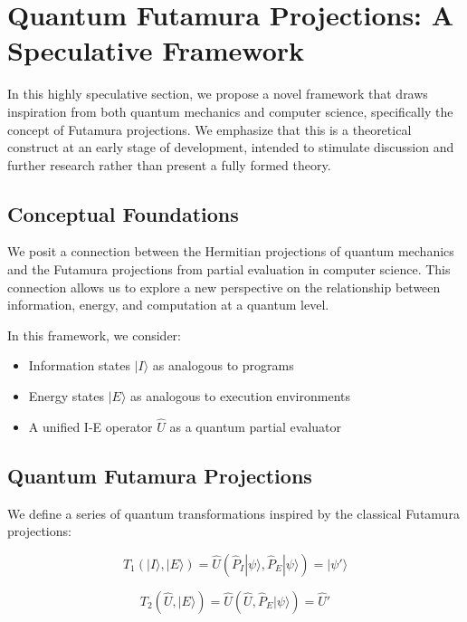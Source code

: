 \section{Quantum Futamura Projections: A Speculative Framework}

In this highly speculative section, we propose a novel framework that draws inspiration from both quantum mechanics and computer science, specifically the concept of Futamura projections. We emphasize that this is a theoretical construct at an early stage of development, intended to stimulate discussion and further research rather than present a fully formed theory.

\subsection{Conceptual Foundations}

We posit a connection between the Hermitian projections of quantum mechanics and the Futamura projections from partial evaluation in computer science. This connection allows us to explore a new perspective on the relationship between information, energy, and computation at a quantum level.

In this framework, we consider:

\begin{itemize}
    \item Information states $|I\rangle$ as analogous to programs
    \item Energy states $|E\rangle$ as analogous to execution environments
    \item A unified I-E operator $\hat{U}$ as a quantum partial evaluator
\end{itemize}

\subsection{Quantum Futamura Projections}

We define a series of quantum transformations inspired by the classical Futamura projections:

\begin{equation}
    T_1(|I\rangle, |E\rangle) = \hat{U}(\hat{P}_I|\psi\rangle, \hat{P}_E|\psi\rangle) = |\psi'\rangle
\end{equation}

\begin{equation}
    T_2(\hat{U}, |E\rangle) = \hat{U}(\hat{U}, \hat{P}_E|\psi\rangle) = \hat{U}'
\end{equation}

